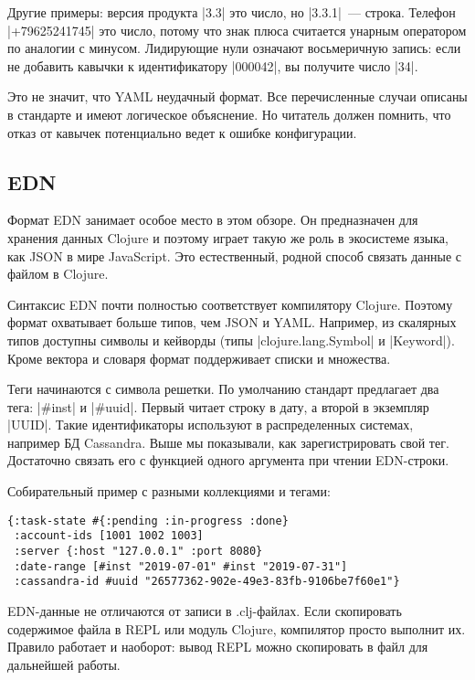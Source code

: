 Другие примеры: версия продукта \spverb|3.3| это число, но \spverb|3.3.1|~--- строка. Телефон
\spverb|+79625241745| это число, потому что знак плюса считается унарным оператором по
аналогии с минусом. Лидирующие нули означают восьмеричную запись: если не
добавить кавычки к идентификатору \spverb|000042|, вы получите число \spverb|34|.

Это не значит, что YAML неудачный формат. Все перечисленные случаи описаны в
стандарте и имеют логическое объяснение. Но читатель должен помнить, что отказ
от кавычек потенциально ведет к ошибке конфигурации.

\subsection{EDN}

Формат EDN занимает особое место в этом обзоре. Он предназначен для хранения
данных Clojure и поэтому играет такую же роль в экосистеме языка, как JSON в
мире JavaScript. Это естественный, родной способ связать данные с файлом в
Clojure.

Синтаксис EDN почти полностью соответствует компилятору Clojure. Поэтому формат
охватывает больше типов, чем JSON и YAML. Например, из скалярных типов доступны
символы и кейворды (типы \spverb|clojure.lang.Symbol| и \spverb|Keyword|). Кроме вектора и
словаря формат поддерживает списки и множества.

Теги начинаются с символа решетки. По умолчанию стандарт предлагает два тега:
\spverb|#inst| и \spverb|#uuid|. Первый читает строку в дату, а второй в экземпляр
\spverb|UUID|. Такие идентификаторы используют в распределенных системах, например БД
Cassandra. Выше мы показывали, как зарегистрировать свой тег. Достаточно связать
его с функцией одного аргумента при чтении EDN-строки.

Собирательный пример с разными коллекциями и тегами:

\begin{verbatim}
{:task-state #{:pending :in-progress :done}
 :account-ids [1001 1002 1003]
 :server {:host "127.0.0.1" :port 8080}
 :date-range [#inst "2019-07-01" #inst "2019-07-31"]
 :cassandra-id #uuid "26577362-902e-49e3-83fb-9106be7f60e1"}
\end{verbatim}

EDN-данные не отличаются от записи в .clj-файлах. Если скопировать содержимое
файла в REPL или модуль Clojure, компилятор просто выполнит их. Правило работает
и наоборот: вывод REPL можно скопировать в файл для дальнейшей работы.

